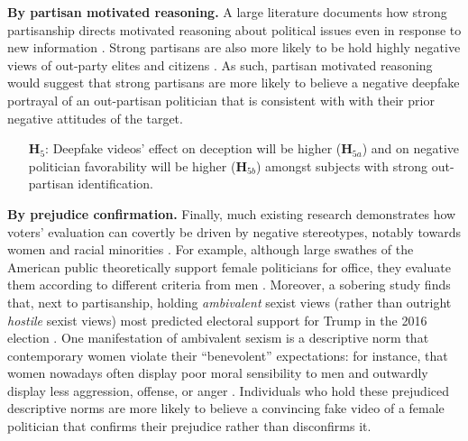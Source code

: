 \documentclass[12pt,letterpaper]{article}
\begin{document}
\noindent \textbf{By partisan motivated reasoning.} A large literature documents how strong partisanship directs motivated reasoning about political issues even in response to new information \citep{kahan2012ideology, druckman2019evidence, bolsen2014influence, leeper2014political, enders2019informational}. Strong partisans are also more likely to be hold highly negative views of out-party elites and citizens \citep{abramowitz2018negative, iyengar2019origins,mccarty2016polarized}. As such, partisan motivated reasoning would suggest that strong partisans are more likely to believe a negative deepfake portrayal of an out-partisan politician that is consistent with with their prior negative attitudes of the target. %

\begin{itemize}
    \item[\textbf{H$_{5}$}:] Deepfake videos' effect on deception will be higher (\textbf{H$_{5a}$}) and on negative politician favorability will be higher (\textbf{H$_{5b}$}) amongst subjects with strong out-partisan identification.
\end{itemize}

\noindent \textbf{By prejudice confirmation.} Finally, much existing research demonstrates how voters' evaluation can covertly be driven by negative stereotypes, notably towards women \citep{jamieson1995beyond,teele2017ties} and racial minorities \citep{valentino2002cues,tesler2010obama}. For example, although large swathes of the American public theoretically support female politicians for office, they evaluate them according to different criteria from men \citep{bauer2020shifting}. Moreover, a sobering study finds that, next to partisanship, holding \textit{ambivalent} sexist views (rather than outright \textit{hostile} sexist views) most predicted electoral support for Trump in the 2016 election \citep{schaffner2018understanding}. One manifestation of ambivalent sexism is a descriptive norm that contemporary women violate their ``benevolent'' expectations: for instance, that women nowadays often display poor moral sensibility to men and outwardly display less aggression, offense, or anger  \citep{glick1996ambivalent}. Individuals who hold these prejudiced descriptive norms are more likely to believe a convincing fake video of a female politician that confirms their prejudice rather than disconfirms it.
\end{document}
